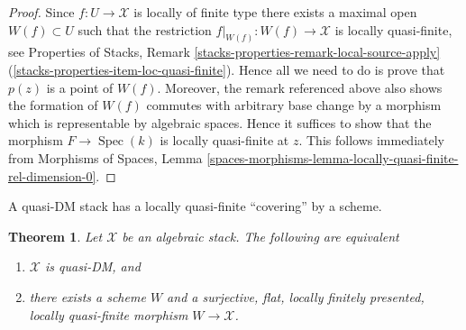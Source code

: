 \documentclass{stacks-project}
\theoremstyle{plain}
\newtheorem{theorem}[subsection]{Theorem}
\theoremstyle{definition}
\theoremstyle{remark}
\numberwithin{equation}{subsection}
\def\Spec{\mathop{\mathrm{Spec}}}
\begin{document}
\begin{proof}
Since $f : U \to \mathcal{X}$ is locally of finite type there exists a
maximal open $W(f) \subset U$ such that the restriction
$f|_{W(f)} : W(f) \to \mathcal{X}$ is locally quasi-finite, see
Properties of Stacks, Remark
\ref{stacks-properties-remark-local-source-apply}
(\ref{stacks-properties-item-loc-quasi-finite}).
Hence all we need to do is prove that $p(z)$ is a point of $W(f)$.
Moreover, the remark referenced above also shows the formation of $W(f)$
commutes with arbitrary base change by a morphism which is representable
by algebraic spaces. Hence it suffices to show that the morphism
$F \to \Spec(k)$ is locally quasi-finite at $z$. This follows
immediately from
Morphisms of Spaces,
Lemma \ref{spaces-morphisms-lemma-locally-quasi-finite-rel-dimension-0}.
\end{proof}

\noindent
A quasi-DM stack has a locally quasi-finite ``covering'' by a scheme.

\begin{theorem}
\label{theorem-quasi-DM}
Let $\mathcal{X}$ be an algebraic stack. The following are equivalent
\begin{enumerate}
\item $\mathcal{X}$ is quasi-DM, and
\item there exists a scheme $W$ and a surjective, flat, locally finitely
presented, locally quasi-finite morphism $W \to \mathcal{X}$.
\end{enumerate}
\end{theorem}
\end{document}
